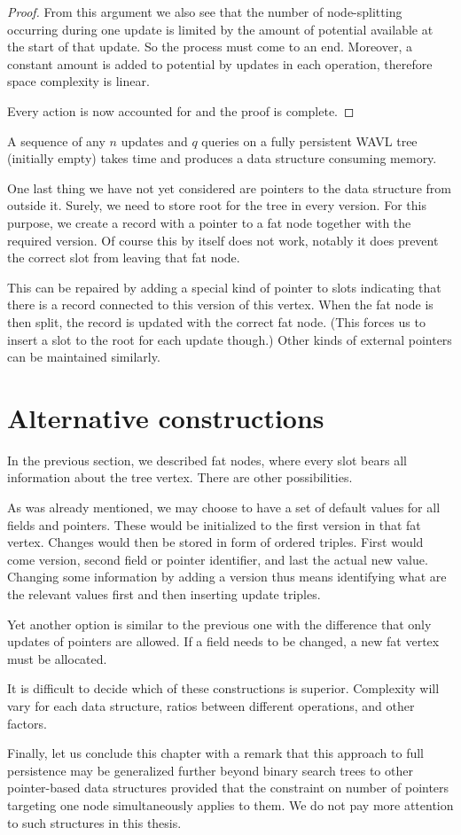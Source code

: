 \begin{proof}
From this argument we also see that the number of node-splitting occurring during one update is limited by the amount of potential available at the start of that update. 
So the process must come to an end. 
Moreover, a constant amount is added to potential by updates in each operation, therefore space complexity is linear.

Every action is now accounted for and the proof is complete.
\end{proof}

\begin{cor}
A sequence of any $n$ updates and $q$ queries on a fully persistent WAVL tree (initially empty) takes  time and produces a data structure consuming  memory.
\end{cor}

One last thing we have not yet considered are pointers to the data structure from outside it. Surely, we need to store root for the tree in every version. For this purpose, we create a record with a pointer to a fat node together with the required version. Of course this by itself does not work, notably it does prevent the correct slot from leaving that fat node. 

This can be repaired by adding a special kind of pointer to slots indicating that there is a record connected to this version of this vertex. When the fat node is then split, the record is updated with the correct fat node. (This forces us to insert a slot to the root for each update though.) Other kinds of external pointers can be maintained similarly.

\section{Alternative constructions}

In the previous section, we described fat nodes, where every slot bears all information about the tree vertex. There are other possibilities.

As was already mentioned, we may choose to have a set of default values for all fields and pointers.
These would be initialized to the first version in that fat vertex. Changes would then be stored in form of ordered triples. First would come version, second field or pointer identifier, and last the actual new value. Changing some information by adding a version thus means identifying what are the relevant values first and then inserting update triples.

Yet another option is similar to the previous one with the difference that only updates of pointers are allowed. If a field needs to be changed, a new fat vertex must be allocated.

It is difficult to decide which of these constructions is superior. Complexity will vary for each data structure, ratios between different operations, and other factors.

Finally, let us conclude this chapter with a remark that this approach to full persistence may be generalized further beyond binary search trees to other pointer-based data structures provided that the constraint on number of pointers targeting one node simultaneously applies to them.
We do not pay more attention to such structures in this thesis.
